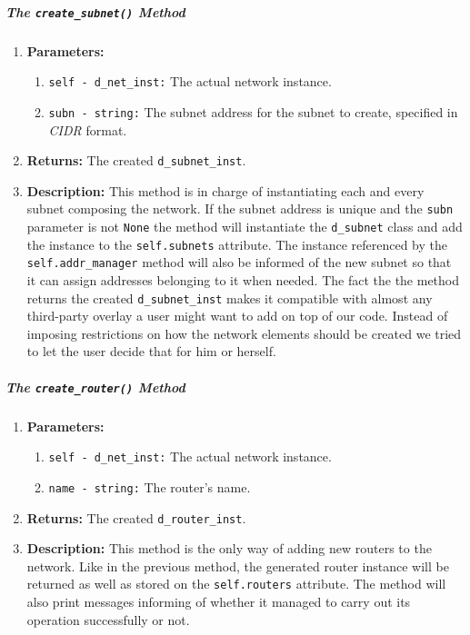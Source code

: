         \subparagraph{The \texttt{create\_subnet()} Method}
            \begin{enumerate}
                \item \textbf{Parameters:}
                \begin{enumerate}
                    \item \texttt{self - d\_net\_inst:} The actual network instance.
                    \item \texttt{subn - string:} The subnet address for the subnet to create, specified in \textit{CIDR} format.
                \end{enumerate}
                \item \textbf{Returns:} The created \texttt{d\_subnet\_inst}.
                \item \textbf{Description:} This method is in charge of instantiating each and every subnet composing the network. If the subnet address is unique and the \texttt{subn} parameter is not \texttt{None} the method will instantiate the \texttt{d\_subnet} class and add the instance to the \texttt{self.subnets} attribute. The instance referenced by the \texttt{self.addr\_manager} method will also be informed of the new subnet so that it can assign addresses belonging to it when needed. The fact the the method returns the created \texttt{d\_subnet\_inst} makes it compatible with almost any third-party overlay a user might want to add on top of our code. Instead of imposing restrictions on how the network elements should be created we tried to let the user decide that for him or herself.
            \end{enumerate}

        \subparagraph{The \texttt{create\_router()} Method}
            \begin{enumerate}
                \item \textbf{Parameters:}
                \begin{enumerate}
                    \item \texttt{self - d\_net\_inst:} The actual network instance.
                    \item \texttt{name - string:} The router's name.
                \end{enumerate}
                \item \textbf{Returns:} The created \texttt{d\_router\_inst}.
                \item \textbf{Description:} This method is the only way of adding new routers to the network. Like in the previous method, the generated router instance will be returned as well as stored on the \texttt{self.routers} attribute. The method will also print messages informing of whether it managed to carry out its operation successfully or not.
            \end{enumerate}

